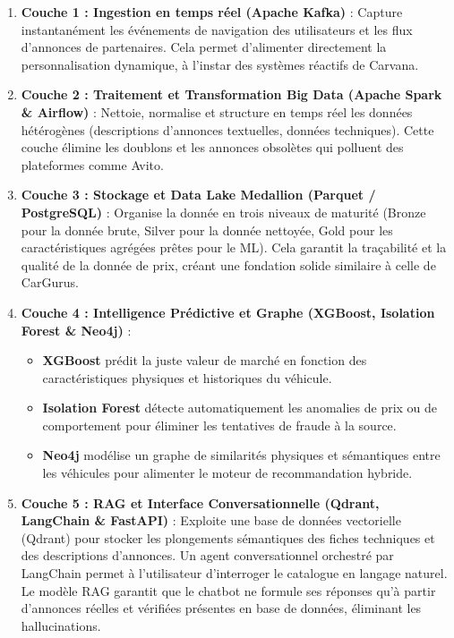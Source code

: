 \documentclass[11pt,a4paper]{article}
\begin{document}
\begin{enumerate}
    \item \textbf{Couche 1 : Ingestion en temps réel (Apache Kafka)} : Capture instantanément les événements de navigation des utilisateurs et les flux d'annonces de partenaires. Cela permet d'alimenter directement la personnalisation dynamique, à l'instar des systèmes réactifs de Carvana.
    \item \textbf{Couche 2 : Traitement et Transformation Big Data (Apache Spark \& Airflow)} : Nettoie, normalise et structure en temps réel les données hétérogènes (descriptions d'annonces textuelles, données techniques). Cette couche élimine les doublons et les annonces obsolètes qui polluent des plateformes comme Avito.
    \item \textbf{Couche 3 : Stockage et Data Lake Medallion (Parquet / PostgreSQL)} : Organise la donnée en trois niveaux de maturité (Bronze pour la donnée brute, Silver pour la donnée nettoyée, Gold pour les caractéristiques agrégées prêtes pour le ML). Cela garantit la traçabilité et la qualité de la donnée de prix, créant une fondation solide similaire à celle de CarGurus.
    \item \textbf{Couche 4 : Intelligence Prédictive et Graphe (XGBoost, Isolation Forest \& Neo4j)} : 
    \begin{itemize}
        \item \textbf{XGBoost} prédit la juste valeur de marché en fonction des caractéristiques physiques et historiques du véhicule.
        \item \textbf{Isolation Forest} détecte automatiquement les anomalies de prix ou de comportement pour éliminer les tentatives de fraude à la source.
        \item \textbf{Neo4j} modélise un graphe de similarités physiques et sémantiques entre les véhicules pour alimenter le moteur de recommandation hybride.
    \end{itemize}
    \item \textbf{Couche 5 : RAG et Interface Conversationnelle (Qdrant, LangChain \& FastAPI)} : Exploite une base de données vectorielle (Qdrant) pour stocker les plongements sémantiques des fiches techniques et des descriptions d'annonces. Un agent conversationnel orchestré par LangChain permet à l'utilisateur d'interroger le catalogue en langage naturel. Le modèle RAG garantit que le chatbot ne formule ses réponses qu'à partir d'annonces réelles et vérifiées présentes en base de données, éliminant les hallucinations.
\end{enumerate}
\end{document}
